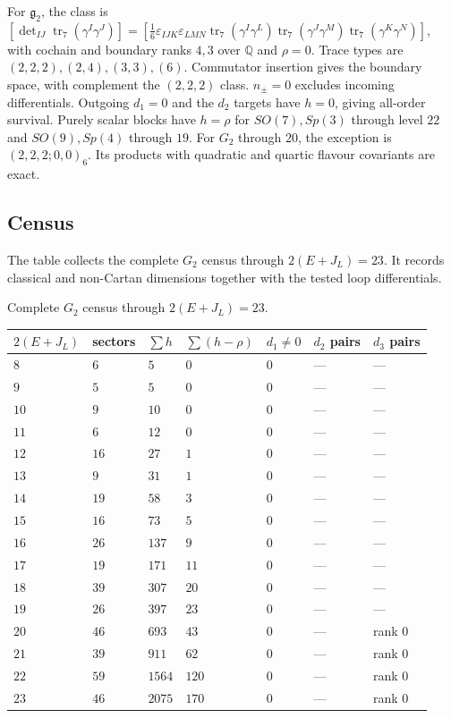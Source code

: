 \documentclass[11pt]{article}
\numberwithin{equation}{section}
\numberwithin{figure}{section}
\numberwithin{table}{section}
\begin{document}
For $\mathfrak g_2$, the class is $[\det_{IJ}\operatorname{tr}_7(\gamma^I\gamma^J)]=[\tfrac16\varepsilon_{IJK}\varepsilon_{LMN}\operatorname{tr}_7(\gamma^I\gamma^L)\operatorname{tr}_7(\gamma^J\gamma^M)\operatorname{tr}_7(\gamma^K\gamma^N)]$, with cochain and boundary ranks $4,3$ over $\mathbb Q$ and $\rho=0$. Trace types are $(2,2,2),(2,4),(3,3),(6)$. Commutator insertion gives the boundary space, with complement the $(2,2,2)$ class. $n_\pm=0$ excludes incoming differentials. Outgoing $d_1=0$ and the $d_2$ targets have $h=0$, giving all-order survival. Purely scalar blocks have $h=\rho$ for $SO(7),Sp(3)$ through level $22$ and $SO(9),Sp(4)$ through $19$. For $G_2$ through $20$, the exception is $(2,2,2;0,0)_6$. Its products with quadratic and quartic flavour covariants are exact.

\subsection{Census}\label{sec-E-G2-census}

The table collects the complete $G_2$ census through $2(E+J_L)=23$. It records classical and non-Cartan dimensions together with the tested loop differentials.

Complete $G_2$ census through $2(E+J_L)=23$.

{\small\renewcommand{\arraystretch}{1.25}\setlength{\tabcolsep}{4pt}
\begin{xltabular}{\linewidth}{@{}llllll>{\raggedright\arraybackslash}X@{}}
\toprule
$2(E+J_L)$ & sectors & $\sum h$ & $\sum(h-\rho)$ & $d_1\ne0$ & $d_2$ pairs & $d_3$ pairs\\
\midrule\endhead
$8$ & $6$ & $5$ & $0$ & $0$ & --- & ---\\
$9$ & $5$ & $5$ & $0$ & $0$ & --- & ---\\
$10$ & $9$ & $10$ & $0$ & $0$ & --- & ---\\
$11$ & $6$ & $12$ & $0$ & $0$ & --- & ---\\
$12$ & $16$ & $27$ & $1$ & $0$ & --- & ---\\
$13$ & $9$ & $31$ & $1$ & $0$ & --- & ---\\
$14$ & $19$ & $58$ & $3$ & $0$ & --- & ---\\
$15$ & $16$ & $73$ & $5$ & $0$ & --- & ---\\
$16$ & $26$ & $137$ & $9$ & $0$ & --- & ---\\
$17$ & $19$ & $171$ & $11$ & $0$ & --- & ---\\
$18$ & $39$ & $307$ & $20$ & $0$ & --- & ---\\
$19$ & $26$ & $397$ & $23$ & $0$ & --- & ---\\
$20$ & $46$ & $693$ & $43$ & $0$ & --- & rank $0$\\
$21$ & $39$ & $911$ & $62$ & $0$ & --- & rank $0$\\
$22$ & $59$ & $1564$ & $120$ & $0$ & --- & rank $0$\\
$23$ & $46$ & $2075$ & $170$ & $0$ & --- & rank $0$\\
\bottomrule
\end{xltabular}}
\end{document}
